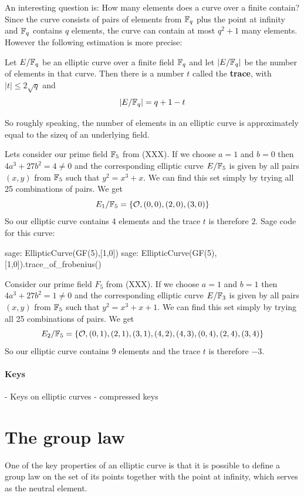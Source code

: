 An interesting question is: How many elements does a curve over a finite contain? Since the curve consists of pairs of elements from $\mathbb{F}_q$ plus the point at infinity and $\mathbb{F}_q$ contains $q$ elements, the curve can contain at most $q^2+1$ many elements. However the following estimation is more precise:
\begin{theorem} Let $E/\mathbb{F}_q$ be an elliptic curve over a finite field $\mathbb{F}_q$ and let $|E/\mathbb{F}_q|$ be the number of elements in that curve. Then there is a number $t$ called the \textbf{trace}, with $|t| \leq 2\sqrt{q}$ and
$$
|E/\mathbb{F}_q| = q +1 -t
$$
\end{theorem}
So roughly speaking, the number of elements in an elliptic curve is approximately equal to the sizeq of an underlying field.
\begin{example}Lets consider our prime field $\mathbb{F}_5$ from (XXX). If we choose $a=1$ and $b=0$ then $4a^3+ 27b^2 = 4 \neq  0 $ and the corresponding elliptic curve $E/\mathbb{F}_{5}$ is given by all pairs $(x,y)$ from $\mathbb{F}_5$ such that $y^2=x^3+x$. We can find this set simply by trying all 25 combinations of pairs. We get
$$
E_1/\mathbb{F}_5 = \{\mathcal{O}, (0,0),(2,0),(3,0)\}
$$
So our elliptic curve contains 4 elements and the trace $t$ is therefore $2$. Sage code for this curve:
\begin{sagecommandline}
sage: EllipticCurve(GF(5),[1,0])
sage: EllipticCurve(GF(5),[1,0]).trace_of_frobenius()
\end{sagecommandline}
\end{example}
\begin{example}Consider our prime field $F_5$ from (XXX). If we choose $a=1$ and $b=1$ then $4a^3+ 27b^2 = 1 \neq  0 $ and the corresponding elliptic curve $E/\mathbb{F}_{3}$ is given by all pairs $(x,y)$ from $\mathbb{F}_5$ such that $y^2=x^3+x+1$. We can find this set simply by trying all 25 combinations of pairs. We get
$$
E_2/\mathbb{F}_5 = \{\mathcal{O}, (0,1),(2,1),(3,1),(4,2),(4,3),(0,4),(2,4),(3,4)\}
$$
So our elliptic curve contains 9 elements and the trace $t$ is therefore $-3$.
\end{example}

\paragraph{Keys}
- Keys on elliptic curves
- compressed keys

\section{The group law}
One of the key properties of an elliptic curve is that it is possible to define a group law on the set of its points together with the point at infinity, which serves as the neutral element.

